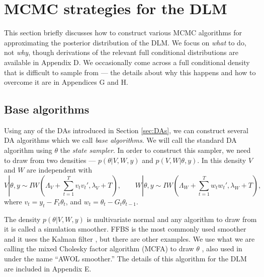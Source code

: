 \documentclass[12pt]{article}
\begin{document}
\section{MCMC strategies for the DLM}\label{sec:Algs}

This section briefly discusses how to construct various MCMC algorithms for approximating the posterior distribution of the DLM. We focus on {\it what} to do, not {\it why}, though derivations of the relevant full conditional distributions are available in Appendix D. We occasionally come across a full conditional density that is difficult to sample from --- the details about why this happens and how to overcome it are in Appendices G and H.

\subsection{Base algorithms}\label{sec:Algs:base}
Using any of the DAs introduced in Section \ref{sec:DAs}, we can construct several DA algorithms which we call {\it base algorithms}. We will call the standard DA algorithm using $\theta$ the {\it state sampler}. In order to construct this sampler, we need to draw from two densities --- $p(\theta|V,W,y)$ and $p(V,W|\theta,y)$. In this density $V$ and $W$ are independent with \vspace{-.1cm}
\[
  V|\theta,y \sim IW\left(\Lambda_V + \sum_{t=1}^Tv_tv_t',\lambda_V + T\right), \qquad
  W|\theta,y \sim IW\left(\Lambda_W + \sum_{t=1}^Tw_tw_t',\lambda_{W} + T\right), %
\]
where $v_t = y_t - F_t\theta_t$, and $w_t = \theta_t - G_t\theta_{t-1}$. 

The density $p(\theta|V,W,y)$ is multivariate normal and any algorithm to draw from it is called a simulation smoother. FFBS is the most commonly used smoother and it uses the Kalman filter \citep{fruhwirth1994data,carter1994gibbs}, but there are other examples.
We use what we are calling the mixed Cholesky factor algorithm (MCFA) to draw $\theta$ \citep{mccausland2011simulation}, also used in \citet{kastner2013ancillarity} under the name ``AWOL smoother.'' The details of this algorithm for the DLM are included in Appendix E.
\end{document}
